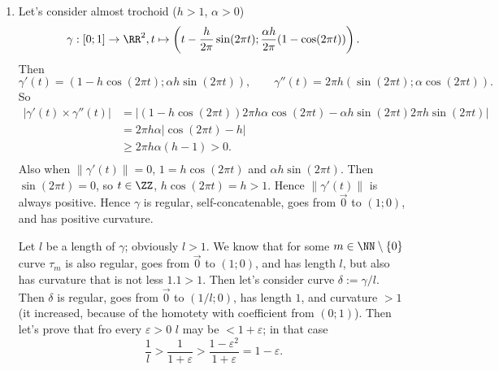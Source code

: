 \documentclass[12pt,a4paper]{article}
\begin{document}
\begin{problem}{72}
        \begin{enumerate}
            \renewcommand{\theenumi}{\alph{enumi}}
            \renewcommand{\labelenumi}{\theenumi)}
            \item Let's consider almost trochoid ($h > 1$, $\alpha > 0$)
                \[\gamma: [0; 1] \to \RR^2, t \mapsto \left(t - \frac{h}{2\pi} \sin(2\pi t); \frac{\alpha h}{2\pi}(1 - \cos(2\pi t))\right).\]
                Then
                \[\gamma'(t) = (1 - h \cos(2\pi t); \alpha h \sin(2\pi t)), \qquad \gamma''(t) = 2\pi h (\sin(2\pi t); \alpha \cos(2\pi t)).\]
                So
                \begin{align*}
                    |\gamma'(t) \times \gamma''(t)|
                    &= |(1 - h \cos(2\pi t)) 2\pi h\alpha \cos(2\pi t) - \alpha h \sin(2\pi t) 2\pi h\sin(2\pi t)|\\
                    &= 2\pi h\alpha |\cos(2\pi t) - h|\\
                    &\geqslant 2\pi h\alpha (h-1) > 0.\\
                \end{align*}
                Also when $\|\gamma'(t)\| = 0$, $1 = h \cos(2\pi t)$ and $\alpha h \sin(2\pi t)$. Then $\sin(2\pi t) = 0$, so $t \in \ZZ$, $h \cos(2\pi t) = h > 1$. Hence $\|\gamma'(t)\|$ is always positive. Hence $\gamma$ is regular, self-concatenable, goes from $\vec{0}$ to $(1; 0)$, and has positive curvature.

                Let $l$ be a length of $\gamma$; obviously $l > 1$. We know that for some $m \in \NN \setminus \{0\}$ curve $\tau_m$ is also regular, goes from $\vec{0}$ to $(1; 0)$, and has length $l$, but also has curvature that is not less $1.1 > 1$. Then let's consider curve $\delta := \gamma/l$. Then $\delta$ is regular, goes from $\vec{0}$ to $(1/l; 0)$, has length $1$, and curvature $> 1$ (it increased, because of the homotety with coefficient from $(0; 1)$). Then let's prove that fro every $\varepsilon > 0$ $l$ may be $< 1 + \varepsilon$; in that case
                \[\frac{1}{l} > \frac{1}{1 + \varepsilon} > \frac{1 - \varepsilon^2}{1 + \varepsilon} = 1 - \varepsilon.\]


\end{enumerate}
\end{problem}
\end{document}
